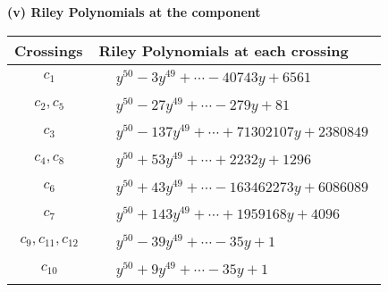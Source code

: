 \documentclass[1p]{elsarticle_modified}
\theoremstyle{definition}
\begin{document}
\newpage\renewcommand{\arraystretch}{1}
\flushleft \textbf{(v) Riley Polynomials at the component}\newline \\
\begin{tabular}{m{50pt}|m{274pt}}
Crossings & \hspace{64pt}Riley Polynomials at each crossing \\
\hline $$\begin{aligned}c_{1}\end{aligned}$$&$\begin{aligned}
&y^{50}-3 y^{49}+\cdots-40743 y+6561
\end{aligned}$\\
\hline $$\begin{aligned}c_{2},c_{5}\end{aligned}$$&$\begin{aligned}
&y^{50}-27 y^{49}+\cdots-279 y+81
\end{aligned}$\\
\hline $$\begin{aligned}c_{3}\end{aligned}$$&$\begin{aligned}
&y^{50}-137 y^{49}+\cdots+71302107 y+2380849
\end{aligned}$\\
\hline $$\begin{aligned}c_{4},c_{8}\end{aligned}$$&$\begin{aligned}
&y^{50}+53 y^{49}+\cdots+2232 y+1296
\end{aligned}$\\
\hline $$\begin{aligned}c_{6}\end{aligned}$$&$\begin{aligned}
&y^{50}+43 y^{49}+\cdots-163462273 y+6086089
\end{aligned}$\\
\hline $$\begin{aligned}c_{7}\end{aligned}$$&$\begin{aligned}
&y^{50}+143 y^{49}+\cdots+1959168 y+4096
\end{aligned}$\\
\hline $$\begin{aligned}c_{9},c_{11},c_{12}\end{aligned}$$&$\begin{aligned}
&y^{50}-39 y^{49}+\cdots-35 y+1
\end{aligned}$\\
\hline $$\begin{aligned}c_{10}\end{aligned}$$&$\begin{aligned}
&y^{50}+9 y^{49}+\cdots-35 y+1
\end{aligned}$\\
\hline
\end{tabular}\\~\\
\end{document}
